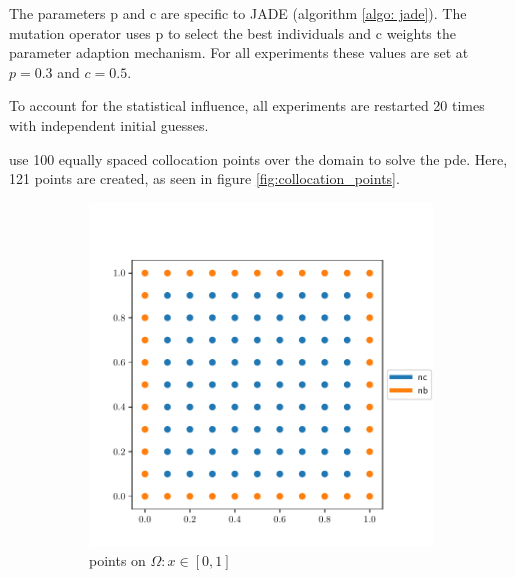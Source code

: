 \documentclass[./\jobname.tex]{subfiles}
\begin{document}
The parameters p and c are specific to JADE (algorithm \ref{algo: jade}). The mutation operator  uses p to select the best individuals and c weights the parameter adaption mechanism. For all experiments these values are set at $p=0.3$ and $c=0.5$. 

To account for the statistical influence, all experiments are restarted 20 times with independent initial guesses. 

\cite{chaquet_using_2019} use 100 equally spaced collocation points over the domain to solve the \gls{pde}. Here, 121 points are created, as seen in figure \ref{fig:collocation_points}. 

\begin{figure}[h]
	\centering
	\begin{subfigure}[b]{0.5\linewidth}
		\centering
		\includegraphics[width=1\textwidth]{../img/pdf/testbed_small_domain.pdf}
		\caption{points on $\Omega: x\in [0,1]$}
		\label{fig:collocation_points_domain_small}
	\end{subfigure}%
	\begin{subfigure}[b]{0.5\linewidth}
		\centering

\end{subfigure}
\end{figure}
\end{document}
